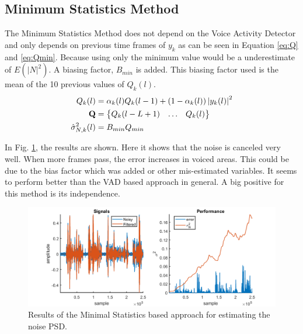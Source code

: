 \subsection{Minimum Statistics Method}
The Minimum Statistics Method does not depend on the Voice Activity Detector and only depends on previous time frames of $y_{k}$ as can be seen in Equation \ref{eq:Q} and \ref{eq:Qmin}. Because using only the minimum value would be a underestimate of $E(|N|^2)$. A biasing factor, $B_{min}$ is added. This biasing factor used is the mean of the 10 previous values of $Q_k(l)$.
\begin{align}
Q_{k}(l) &= \alpha_k(l)Q_k(l-1)+(1-\alpha_k(l))\abs{y_{k}(l)}^{2}\label{eq:Qk} \\
  \mathbf{Q} &=
  \begin{Bmatrix}
    Q_{k}(l-L+1) & \hdots & Q_{k}(l)
  \end{Bmatrix}
  \label{eq:Q} \\
  \hat \sigma_{N,k}^{2}(l) &= B_{min}Q_{min}
  \label{eq:Qmin}\\
\end{align}

In Fig. \ref{fig:minstatnoise}, the results are shown. Here it shows that the noise is canceled very well. When more frames pass, the error increases in voiced areas. This could be due to the bias factor which was added or other mis-estimated variables. It seems to perform better than the VAD based approach in general. A big positive for this method is its independence.

\begin{figure}
  \centering
  \includegraphics[width=\textwidth]{images/msmethod.png}
  \caption{Results of the Minimal Statistics based approach for estimating the noise PSD.}
  \label{fig:minstatnoise}
\end{figure}

